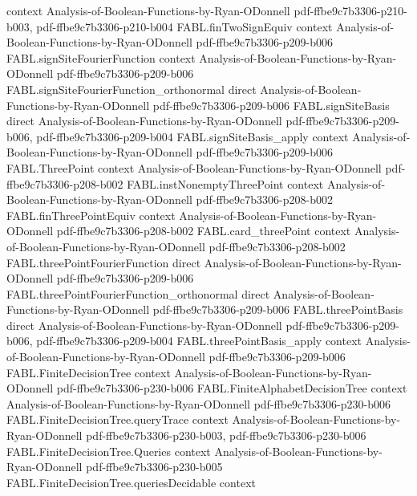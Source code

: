 \begin{theorem}
  {context}
  {Analysis-of-Boolean-Functions-by-Ryan-ODonnell}
  {pdf-ffbe9c7b3306-p210-b003,
    pdf-ffbe9c7b3306-p210-b004}
\proofstep
  {FABL.finTwoSignEquiv}
  {context}
  {Analysis-of-Boolean-Functions-by-Ryan-ODonnell}
  {pdf-ffbe9c7b3306-p209-b006}
\proofstep
  {FABL.signSiteFourierFunction}
  {context}
  {Analysis-of-Boolean-Functions-by-Ryan-ODonnell}
  {pdf-ffbe9c7b3306-p209-b006}
\proofstep
  {FABL.signSiteFourierFunction_orthonormal}
  {direct}
  {Analysis-of-Boolean-Functions-by-Ryan-ODonnell}
  {pdf-ffbe9c7b3306-p209-b006}
\proofstep
  {FABL.signSiteBasis}
  {direct}
  {Analysis-of-Boolean-Functions-by-Ryan-ODonnell}
  {pdf-ffbe9c7b3306-p209-b006,
    pdf-ffbe9c7b3306-p209-b004}
\proofstep
  {FABL.signSiteBasis_apply}
  {context}
  {Analysis-of-Boolean-Functions-by-Ryan-ODonnell}
  {pdf-ffbe9c7b3306-p209-b006}
\proofstep
  {FABL.ThreePoint}
  {context}
  {Analysis-of-Boolean-Functions-by-Ryan-ODonnell}
  {pdf-ffbe9c7b3306-p208-b002}
\proofstep
  {FABL.instNonemptyThreePoint}
  {context}
  {Analysis-of-Boolean-Functions-by-Ryan-ODonnell}
  {pdf-ffbe9c7b3306-p208-b002}
\proofstep
  {FABL.finThreePointEquiv}
  {context}
  {Analysis-of-Boolean-Functions-by-Ryan-ODonnell}
  {pdf-ffbe9c7b3306-p208-b002}
\proofstep
  {FABL.card_threePoint}
  {context}
  {Analysis-of-Boolean-Functions-by-Ryan-ODonnell}
  {pdf-ffbe9c7b3306-p208-b002}
\proofstep
  {FABL.threePointFourierFunction}
  {direct}
  {Analysis-of-Boolean-Functions-by-Ryan-ODonnell}
  {pdf-ffbe9c7b3306-p209-b006}
\proofstep
  {FABL.threePointFourierFunction_orthonormal}
  {direct}
  {Analysis-of-Boolean-Functions-by-Ryan-ODonnell}
  {pdf-ffbe9c7b3306-p209-b006}
\proofstep
  {FABL.threePointBasis}
  {direct}
  {Analysis-of-Boolean-Functions-by-Ryan-ODonnell}
  {pdf-ffbe9c7b3306-p209-b006,
    pdf-ffbe9c7b3306-p209-b004}
\proofstep
  {FABL.threePointBasis_apply}
  {context}
  {Analysis-of-Boolean-Functions-by-Ryan-ODonnell}
  {pdf-ffbe9c7b3306-p209-b006}
\proofstep
  {FABL.FiniteDecisionTree}
  {context}
  {Analysis-of-Boolean-Functions-by-Ryan-ODonnell}
  {pdf-ffbe9c7b3306-p230-b006}
\proofstep
  {FABL.FiniteAlphabetDecisionTree}
  {context}
  {Analysis-of-Boolean-Functions-by-Ryan-ODonnell}
  {pdf-ffbe9c7b3306-p230-b006}
\proofstep
  {FABL.FiniteDecisionTree.queryTrace}
  {context}
  {Analysis-of-Boolean-Functions-by-Ryan-ODonnell}
  {pdf-ffbe9c7b3306-p230-b003,
    pdf-ffbe9c7b3306-p230-b006}
\proofstep
  {FABL.FiniteDecisionTree.Queries}
  {context}
  {Analysis-of-Boolean-Functions-by-Ryan-ODonnell}
  {pdf-ffbe9c7b3306-p230-b005}
\proofstep
  {FABL.FiniteDecisionTree.queriesDecidable}
  {context}

\end{theorem}
